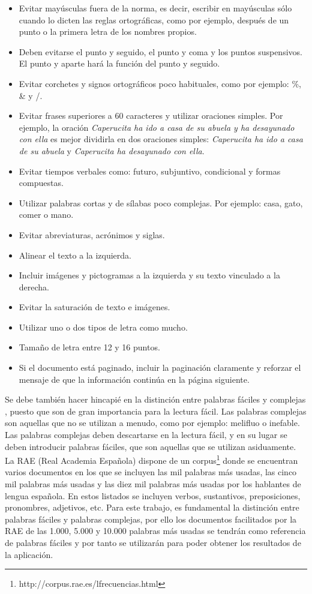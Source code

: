 \begin{itemize}
	\item Evitar mayúsculas fuera de la norma, es decir, escribir en mayúsculas sólo cuando lo dicten las reglas ortográficas, como por ejemplo, después de un punto o la primera letra de los nombres propios.
	\item Deben evitarse el punto y seguido, el punto y coma y los puntos suspensivos. El punto y aparte hará la función del punto y seguido.
	\item Evitar corchetes y signos ortográficos poco habituales, como por ejemplo: \%, \& y /.
	\item Evitar frases superiores a 60 caracteres y utilizar oraciones simples. Por ejemplo, la oración \textit{Caperucita ha ido a casa de su abuela y ha desayunado con ella} es mejor dividirla en dos oraciones simples:\textit{ Caperucita ha ido a casa de su abuela} y  \textit{Caperucita ha desayunado con ella}.
	\item Evitar tiempos verbales como: futuro, subjuntivo, condicional y formas compuestas.
	\item Utilizar palabras cortas y de sílabas poco complejas. 
	Por ejemplo: casa, gato, comer o mano.
	\item Evitar abreviaturas, acrónimos y siglas.
	\item Alinear el texto a la izquierda.
	\item Incluir imágenes y pictogramas a la izquierda y su texto vinculado a la derecha.
	\item Evitar la saturación de texto e imágenes.
	\item Utilizar uno o dos tipos de letra como mucho.
	\item Tamaño de letra entre 12 y 16 puntos.
	\item Si el documento está paginado, incluir la paginación claramente y reforzar el mensaje de que la información continúa en la página siguiente.
\end{itemize}

Se debe también hacer hincapié en la distinción entre palabras fáciles y complejas \citep{GarciaMunoz2012LecturaFacil}, puesto que son de gran importancia para la lectura fácil. 
Las palabras complejas son aquellas que no se utilizan a menudo, como por ejemplo: melifluo o inefable. Las palabras complejas deben descartarse en la lectura fácil, y en su lugar se deben introducir palabras fáciles, que son aquellas que se utilizan asiduamente. La RAE (Real Academia Española) dispone de un corpus\footnote{http://corpus.rae.es/lfrecuencias.html} donde se encuentran varios documentos en los que se incluyen las mil palabras más usadas, las cinco mil palabras más usadas y las diez mil palabras más usadas por los hablantes de lengua española. En estos listados se incluyen verbos, sustantivos, preposiciones, pronombres, adjetivos, etc.
Para este trabajo, es fundamental la distinción entre palabras fáciles y palabras complejas, por ello los documentos facilitados por la RAE de las 1.000, 5.000 y 10.000 palabras más usadas se tendrán como referencia de palabras fáciles y por tanto se utilizarán para poder obtener los resultados de la aplicación. 
 

